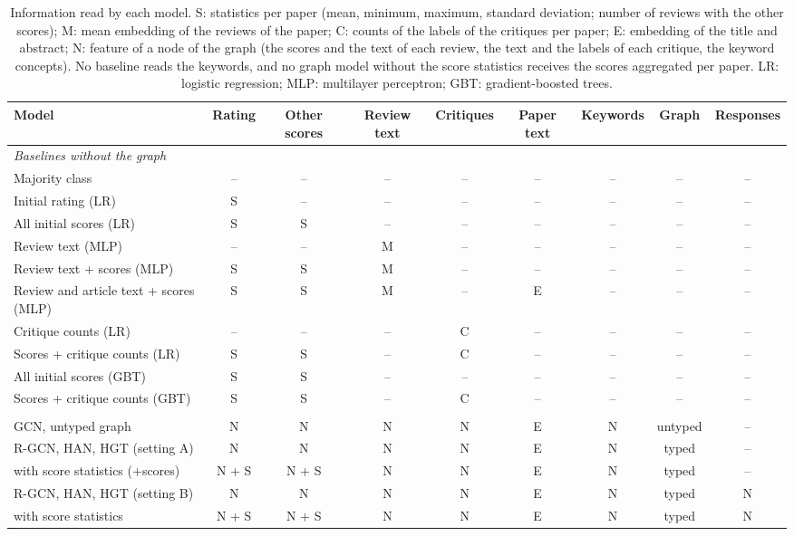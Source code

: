 \begin{table}[t]
\centering
\footnotesize
\setlength{\tabcolsep}{2pt}
\caption{Information read by each model. S: statistics per paper (mean, minimum, maximum, standard deviation; number of reviews with the other scores); M: mean embedding of the reviews of the paper; C: counts of the labels of the critiques per paper; E: embedding of the title and abstract; N: feature of a node of the graph (the scores and the text of each review, the text and the labels of each critique, the keyword concepts). No baseline reads the keywords, and no graph model without the score statistics receives the scores aggregated per paper. LR: logistic regression; MLP: multilayer perceptron; GBT: gradient-boosted trees.}
\label{tab:model-inputs}
\begin{tabular}{@{}lcccccccc@{}}
\toprule
Model & Rating & Other scores & Review text & Critiques & Paper text & Keywords & Graph & Responses \\
\midrule
\multicolumn{9}{l}{\emph{Baselines without the graph}} \\
Majority class & -- & -- & -- & -- & -- & -- & -- & -- \\
Initial rating (LR) & S & -- & -- & -- & -- & -- & -- & -- \\
All initial scores (LR) & S & S & -- & -- & -- & -- & -- & -- \\
Review text (MLP) & -- & -- & M & -- & -- & -- & -- & -- \\
Review text + scores (MLP) & S & S & M & -- & -- & -- & -- & -- \\
Review and article text + scores (MLP) & S & S & M & -- & E & -- & -- & -- \\
Critique counts (LR) & -- & -- & -- & C & -- & -- & -- & -- \\
Scores + critique counts (LR) & S & S & -- & C & -- & -- & -- & -- \\
All initial scores (GBT) & S & S & -- & -- & -- & -- & -- & -- \\
Scores + critique counts (GBT) & S & S & -- & C & -- & -- & -- & -- \\
\addlinespace
\multicolumn{9}{l}{\emph{Graph models}} \\
GCN, untyped graph & N & N & N & N & E & N & untyped & -- \\
R-GCN, HAN, HGT (setting A) & N & N & N & N & E & N & typed & -- \\
\quad with score statistics (+scores) & N + S & N + S & N & N & E & N & typed & -- \\
R-GCN, HAN, HGT (setting B) & N & N & N & N & E & N & typed & N \\
\quad with score statistics & N + S & N + S & N & N & E & N & typed & N \\
\bottomrule
\end{tabular}
\end{table}
